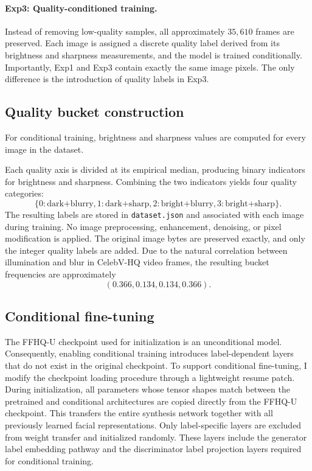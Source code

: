 \documentclass{article}
\begin{document}
\paragraph{Exp3: Quality-conditioned training.}
Instead of removing low-quality samples, all approximately $35,610$ frames are preserved. Each image is assigned a discrete quality label derived from its brightness and sharpness measurements, and the model is trained conditionally. Importantly, Exp1 and Exp3 contain exactly the same image pixels. The only difference is the introduction of quality labels in Exp3.

\subsection{Quality bucket construction}
For conditional training, brightness and sharpness values are computed for every image in the dataset.

Each quality axis is divided at its empirical median, producing binary indicators for brightness and sharpness. Combining the two indicators yields four quality categories:
\[ \{0:\text{dark+blurry}, 1:\text{dark+sharp}, 2:\text{bright+blurry}, 3:\text{bright+sharp}\}. \]
The resulting labels are stored in \texttt{dataset.json} and associated with each image during training. No image preprocessing, enhancement, denoising, or pixel modification is applied. The original image bytes are preserved exactly, and only the integer quality labels are added. Due to the natural correlation between illumination and blur in CelebV-HQ video frames, the resulting bucket frequencies are approximately
\[ (0.366, 0.134, 0.134, 0.366). \]

\subsection{Conditional fine-tuning}
The FFHQ-U checkpoint used for initialization is an unconditional model. Consequently, enabling conditional training introduces label-dependent layers that do not exist in the original checkpoint. To support conditional fine-tuning, I modify the checkpoint loading procedure through a lightweight resume patch. During initialization, all parameters whose tensor shapes match between the pretrained and conditional architectures are copied directly from the FFHQ-U checkpoint. This transfers the entire synthesis network together with all previously learned facial representations. Only label-specific layers are excluded from weight transfer and initialized randomly. These layers include the generator label embedding pathway and the discriminator label projection layers required for conditional training.
\end{document}
